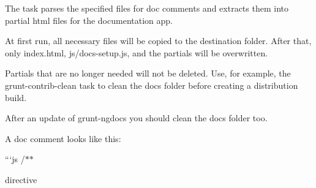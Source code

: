 The task parses the specified files for doc comments and extracts them into partial html files for the documentation app.

At first run, all necessary files will be copied to the destination folder. After that, only index.\+html, js/docs-\/setup.\+js, and the partials will be overwritten.

Partials that are no longer needed will not be deleted. Use, for example, the grunt-\/contrib-\/clean task to clean the docs folder before creating a distribution build.

After an update of grunt-\/ngdocs you should clean the docs folder too.

A doc comment looks like this\+:

```js /$\ast$$\ast$
\begin{DoxyItemize}
\item directive
\item 
\end{DoxyItemize}